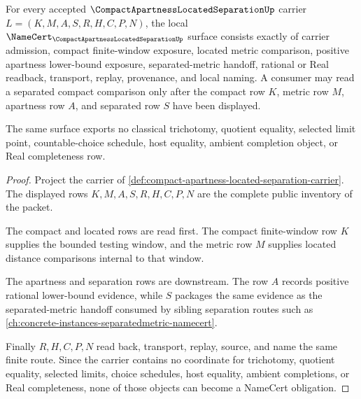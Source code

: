 \begin{theorem}
\label{thm:compact-apartness-located-separation-namecert-obligations}
For every accepted $\CompactApartnessLocatedSeparationUp$ carrier $L=(K,M,A,S,R,H,C,P,N)$, the local $\NameCert_{\CompactApartnessLocatedSeparationUp}$ surface consists exactly of carrier admission, compact finite-window exposure, located metric comparison, positive apartness lower-bound exposure, separated-metric handoff, rational or Real readback, transport, replay, provenance, and local naming. A consumer may read a separated compact comparison only after the compact row $K$, metric row $M$, apartness row $A$, and separated row $S$ have been displayed.

The same surface exports no classical trichotomy, quotient equality, selected limit point, countable-choice schedule, host equality, ambient completion object, or Real completeness row.
\end{theorem}
\begin{proof}
Project the carrier of \autoref{def:compact-apartness-located-separation-carrier}. The displayed rows $K,M,A,S,R,H,C,P,N$ are the complete public inventory of the packet.

The compact and located rows are read first. The compact finite-window row $K$ supplies the bounded testing window, and the metric row $M$ supplies located distance comparisons internal to that window.

The apartness and separation rows are downstream. The row $A$ records positive rational lower-bound evidence, while $S$ packages the same evidence as the separated-metric handoff consumed by sibling separation routes such as \autoref{ch:concrete-instances-separatedmetric-namecert}.

Finally $R,H,C,P,N$ read back, transport, replay, source, and name the same finite route. Since the carrier contains no coordinate for trichotomy, quotient equality, selected limits, choice schedules, host equality, ambient completions, or Real completeness, none of those objects can become a NameCert obligation.
\end{proof}




